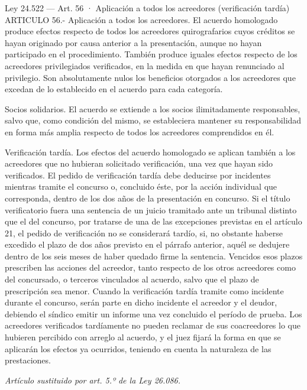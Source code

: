 \documentclass[12pt,oneside]{book}
\begin{document}
\begin{legal}{Ley 24.522 — Art. 56 · Aplicación a todos los acreedores (verificación tardía)}
ARTICULO 56.- Aplicación a todos los acreedores. El acuerdo homologado produce efectos respecto de todos los acreedores quirografarios cuyos créditos se hayan originado por causa anterior a la presentación, aunque no hayan participado en el procedimiento. También produce iguales efectos respecto de los acreedores privilegiados verificados, en la medida en que hayan renunciado al privilegio. Son absolutamente nulos los beneficios otorgados a los acreedores que excedan de lo establecido en el acuerdo para cada categoría.

Socios solidarios. El acuerdo se extiende a los socios ilimitadamente responsables, salvo que, como condición del mismo, se estableciera mantener su responsabilidad en forma más amplia respecto de todos los acreedores comprendidos en él.

Verificación tardía. Los efectos del acuerdo homologado se aplican también a los acreedores que no hubieran solicitado verificación, una vez que hayan sido verificados. El pedido de verificación tardía debe deducirse por incidentes mientras tramite el concurso o, concluido éste, por la acción individual que corresponda, dentro de los dos años de la presentación en concurso. Si el título verificatorio fuera una sentencia de un juicio tramitado ante un tribunal distinto que el del concurso, por tratarse de una de las excepciones previstas en el artículo 21, el pedido de verificación no se considerará tardío, si, no obstante haberse excedido el plazo de dos años previsto en el párrafo anterior, aquél se dedujere dentro de los seis meses de haber quedado firme la sentencia. Vencidos esos plazos prescriben las acciones del acreedor, tanto respecto de los otros acreedores como del concursado, o terceros vinculados al acuerdo, salvo que el plazo de prescripción sea menor. Cuando la verificación tardía tramite como incidente durante el concurso, serán parte en dicho incidente el acreedor y el deudor, debiendo el síndico emitir un informe una vez concluido el período de prueba. Los acreedores verificados tardíamente no pueden reclamar de sus coacreedores lo que hubieren percibido con arreglo al acuerdo, y el juez fijará la forma en que se aplicarán los efectos ya ocurridos, teniendo en cuenta la naturaleza de las prestaciones.

{\footnotesize\itshape Artículo sustituido por art. 5.º de la Ley 26.086.}
\end{legal}
\end{document}
